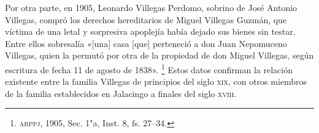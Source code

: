 \documentclass[14pt,twoside,final]{extbook} %
\let\oldfootnote\footnote
\renewcommand\footnote[1]{%
\oldfootnote{\hspace{1mm}#1}}
\begin{document}
Por otra parte, en 1905, Leonardo Villegas Perdomo, sobrino de José Antonio Villegas, compró los derechos hereditarios de Miguel Villegas Guzmán, que víctima de una letal y sorpresiva apoplejía había dejado sus bienes sin testar. Entre ellos sobresalía «[una] casa [que] perteneció a don Juan Nepomuceno Villegas, quien la permutó por otra de la propiedad de don Miguel Villegas, según escritura de fecha 11 de agosto de 1838».\footnote{\textsc{arppj}, 1905, Sec. 1"a, Inst. 8, fs. 27--34.} Estos datos confirman la relación existente entre la familia Villegas de principios del siglo \textsc{xix}, con otros miembros de la familia establecidos en Jalacingo a finales del siglo \textsc{xviii}.
\end{document}
